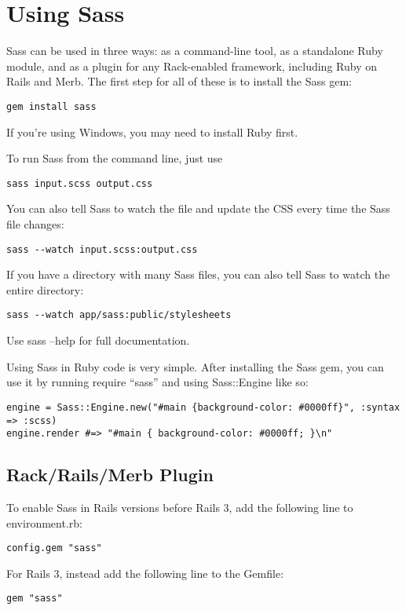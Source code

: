 \documentclass[10pt]{article}
\begin{document}
\section{Using Sass}


 Sass can be used in three ways: as a command-line tool, as a standalone Ruby module, and as a plugin for any Rack-enabled framework, including Ruby on Rails and Merb. The first step for all of these is to install the Sass gem:
\begin{verbatim}
gem install sass
\end{verbatim}


 If you’re using Windows, you may need to install Ruby first.


 To run Sass from the command line, just use
\begin{verbatim}
sass input.scss output.css
\end{verbatim}


 You can also tell Sass to watch the file and update the CSS every time the Sass file changes:
\begin{verbatim}
sass --watch input.scss:output.css
\end{verbatim}


 If you have a directory with many Sass files, you can also tell Sass to watch the entire directory:
\begin{verbatim}
sass --watch app/sass:public/stylesheets
\end{verbatim}


 Use sass --help for full documentation.


 Using Sass in Ruby code is very simple. After installing the Sass gem, you can use it by running require ``sass'' and using Sass::Engine like so:
\begin{verbatim}
engine = Sass::Engine.new("#main {background-color: #0000ff}", :syntax => :scss)
engine.render #=> "#main { background-color: #0000ff; }\n"
\end{verbatim}
\subsection{Rack/Rails/Merb Plugin}


 To enable Sass in Rails versions before Rails 3, add the following line to environment.rb:
\begin{verbatim}
config.gem "sass"
\end{verbatim}


 For Rails 3, instead add the following line to the Gemfile:
\begin{verbatim}
gem "sass"
\end{verbatim}
\end{document}
